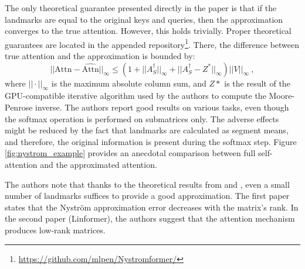 The only theoretical guarantee presented directly in the paper is that if the landmarks are equal to the original keys and queries, then the approximation converges to the true attention. 
However, this holds trivially.
Proper theoretical guarantees are located in the appended repository\footnote{\url{https://github.com/mlpen/Nystromformer/}}.
There, the difference between true attention and the approximation is bounded by:
\begin{equation}
        ||\text{Attn}-\widehat{\text{Attn}}||_\infty\leq(1+||A^\dagger_S||_\infty+||A^\dagger_S-Z^*||_\infty)||V||_\infty\ ,
\end{equation}
where $||\cdot||_\infty$ is the maximum absolute column sum, and $Z*$ is the result of the GPU-compatible iterative algorithm \citep{iterative-moore} used by the authors to compute the Moore-Penrose inverse.
The authors report good results on various tasks, even though the softmax operation is performed on submatrices only. 
The adverse effects might be reduced by the fact that landmarks are calculated as segment means, and therefore, the original information is present during the softmax step.
Figure \ref{fig:nystrom_example} provides an anecdotal comparison between full self-attention and the approximated attention.

The authors note that thanks to the theoretical results from \citep{nystr-2017} and \citep{linformer}, even a small number of landmarks suffices to provide a good approximation.
The first paper states that the Nystr\"om approximation error decreases with the matrix's rank.
In the second paper (Linformer), the authors suggest that the attention mechanism produces low-rank matrices.  